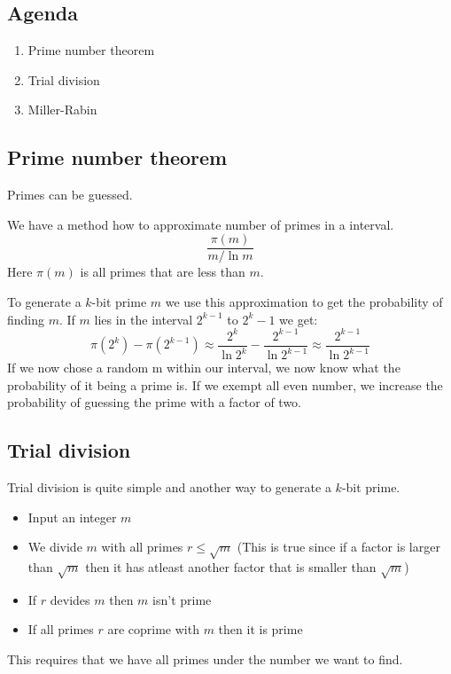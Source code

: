 

\subsection*{Agenda}
\begin{enumerate}
\item Prime number theorem
\item Trial division
\item Miller-Rabin
\end{enumerate}

\subsection{Prime number theorem}
Primes can be guessed.

We have a method how to approximate number of primes in a interval.
\[ \frac{\pi (m)}{m/\ln m} \]
Here $\pi (m)$ is all primes that are less than $m$.

To generate a $k$-bit prime $m$ we use this approximation to get the
probability of finding $m$. If $m$ lies in the interval $2^{k-1}$ to
$2^k-1$ we get:
\[
\pi (2^k)-\pi (2^{k-1}) \approx
\frac{2^k}{\ln 2^k}-\frac{2^{k-1}}{\ln 2^{k-1}}
\approx \frac{2^{k-1}}{\ln 2^{k-1}}
\]
If we now chose a random m within our interval, we now know what the
probability of it being a prime is. If we exempt all even number, we
increase the probability of guessing the prime with a factor of two.

\subsection{Trial division}
Trial division is quite simple and another way to generate a $k$-bit
prime.
\begin{itemize}
\item Input an integer $m$
\item We divide $m$ with all primes $r\le \sqrt{m}$ (This is true since
  if a factor is larger than $\sqrt{m}$ then it has atleast another
  factor that is smaller than $\sqrt{m}$)
\item If $r$ devides $m$ then $m$ isn't prime
\item If all primes $r$ are coprime with $m$ then it is prime
\end{itemize}
This requires that we have all primes under the number we want to find.

